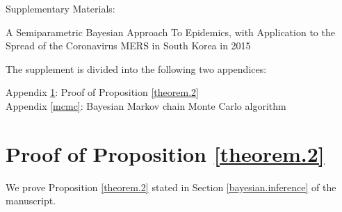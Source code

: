 \documentclass[12pt,usenatbib,referee]{article}
\begin{document}
\begin{appendix}

\begin{center}
\Large
Supplementary Materials:

A Semiparametric Bayesian Approach To Epidemics,\linebreak
with Application to the Spread of the Coronavirus MERS in South Korea in 2015

\end{center}

\maketitle

The supplement is divided into the following two appendices:\s

\noindent
{Appendix \ref{appendix.b}: Proof of Proposition \ref{theorem.2}}\dotfill\pageref{appendix.b}\s
\\
{Appendix \ref{mcmc}: Bayesian Markov chain Monte Carlo algorithm}\dotfill\pageref{mcmc}

\section{Proof of Proposition \ref{theorem.2}}
\label{appendix.b} 

We prove Proposition \ref{theorem.2} stated in Section \ref{bayesian.inference} of the manuscript.\s


\end{appendix}
\end{document}
